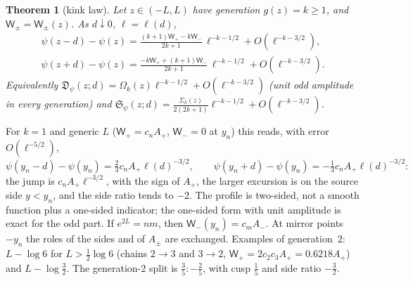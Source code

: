 \documentclass[11pt]{amsart}
\newcommand{\Dj}{\mathfrak{D}}
\newcommand{\Sj}{\mathfrak{S}}
\newtheorem{theorem}{Theorem}[section]
\theoremstyle{definition}
\theoremstyle{remark}
\numberwithin{equation}{section}
\begin{document}
\begin{theorem}[kink law]\label{thm:kink}
Let $z\in(-L,L)$ have generation $g(z)=k\ge1$, and $\mathsf W_\pm=\mathsf W_\pm(z)$. As $d\downarrow0$, $\ell=\ell(d)$,
\begin{gather*}
\psi(z-d)-\psi(z)=\frac{(k+1)\mathsf W_+-k\mathsf W_-}{2k+1}\,\ell^{-k-1/2}+O(\ell^{-k-3/2}),\\
\psi(z+d)-\psi(z)=\frac{-k\mathsf W_++(k+1)\mathsf W_-}{2k+1}\,\ell^{-k-1/2}+O(\ell^{-k-3/2}).
\end{gather*}
Equivalently $\Dj_\psi(z;d)=\Omega_k(z)\ell^{-k-1/2}+O(\ell^{-k-3/2})$ (unit odd amplitude in every generation) and $\Sj_\psi(z;d)=\frac{\Sigma_k(z)}{2(2k+1)}\ell^{-k-1/2}+O(\ell^{-k-3/2})$.
\end{theorem}

For $k=1$ and generic $L$ ($\mathsf W_+=c_nA_+$, $\mathsf W_-=0$ at $y_n$) this reads, with error $O(\ell^{-5/2})$,
\[
\psi(y_n-d)-\psi(y_n)=\tfrac23c_nA_+\ell(d)^{-3/2},\qquad\psi(y_n+d)-\psi(y_n)=-\tfrac13c_nA_+\ell(d)^{-3/2}:
\]
the jump is $c_nA_+\ell^{-3/2}$, with the sign of $A_+$, the larger excursion is on the source side $y<y_n$, and the side ratio tends to $-2$. The profile is two-sided, not a smooth function plus a one-sided indicator; the one-sided form with unit amplitude is exact for the odd part. If $e^{2L}=nm$, then $\mathsf W_-(y_n)=c_mA_-$. At mirror points $-y_n$ the roles of the sides and of $A_\pm$ are exchanged. Examples of generation~$2$: $L-\log6$ for $L>\frac12\log6$ (chains $2\to3$ and $3\to2$, $\mathsf W_+=2c_2c_3A_+=0.6218A_+$) and $L-\log\frac32$. The generation-$2$ split is $\frac35:-\frac25$, with cusp $\frac15$ and side ratio $-\frac32$.
\end{document}
